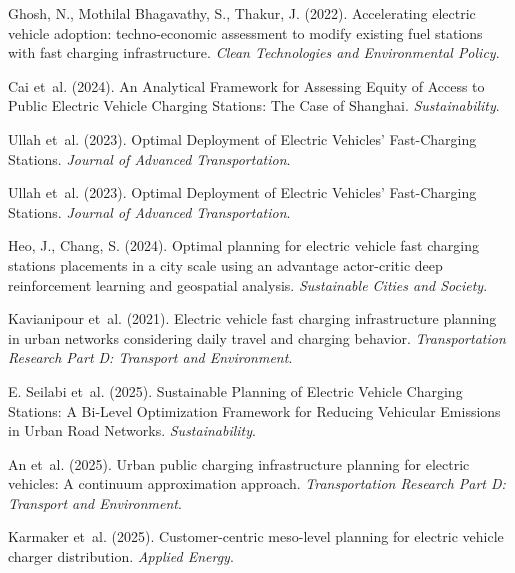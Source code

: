 Ghosh, N., Mothilal Bhagavathy, S., Thakur, J. (2022). Accelerating electric vehicle adoption: techno-economic assessment to modify existing fuel stations with fast charging infrastructure.
\textit{Clean Technologies and Environmental Policy}.

Cai et~al. (2024). An Analytical Framework for Assessing Equity of Access to Public Electric Vehicle Charging Stations: The Case of Shanghai.
\textit{Sustainability}.

Ullah et~al. (2023). Optimal Deployment of Electric Vehicles’ Fast-Charging Stations.
\textit{Journal of Advanced Transportation}.

Ullah et~al. (2023). Optimal Deployment of Electric Vehicles’ Fast-Charging Stations.
\textit{Journal of Advanced Transportation}.

Heo, J., Chang, S. (2024). Optimal planning for electric vehicle fast charging stations placements in a city scale using an advantage actor-critic deep reinforcement learning and geospatial analysis.
\textit{Sustainable Cities and Society}.

Kavianipour et~al. (2021). Electric vehicle fast charging infrastructure planning in urban networks considering daily travel and charging behavior.
\textit{Transportation Research Part D: Transport and Environment}.

E. Seilabi et~al. (2025). Sustainable Planning of Electric Vehicle Charging Stations: A Bi-Level Optimization Framework for Reducing Vehicular Emissions in Urban Road Networks.
\textit{Sustainability}.

An et~al. (2025). Urban public charging infrastructure planning for electric vehicles: A continuum approximation approach.
\textit{Transportation Research Part D: Transport and Environment}.

Karmaker et~al. (2025). Customer-centric meso-level planning for electric vehicle charger distribution.
\textit{Applied Energy}.

